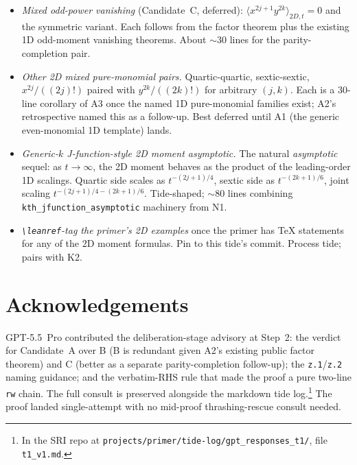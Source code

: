 \documentclass[11pt]{article}
\begin{document}
\begin{itemize}[leftmargin=1em,itemsep=0.2em]
\item \emph{Mixed odd-power vanishing} (Candidate~C, deferred):
  $\langle x^{2j+1} y^{2k} \rangle_{2D, t} = 0$ and the symmetric
  variant. Each follows from the factor theorem plus the existing
  1D odd-moment vanishing theorems. About ${\sim}30$ lines for the
  parity-completion pair.

\item \emph{Other 2D mixed pure-monomial pairs.} Quartic-quartic,
  sextic-sextic, $x^{2j}/((2j)!)$ paired with $y^{2k}/((2k)!)$ for
  arbitrary $(j, k)$. Each is a 30-line corollary of A3 once the
  named 1D pure-monomial families exist; A2's retrospective named
  this as a follow-up. Best deferred until A1 (the generic
  even-monomial 1D template) lands.

\item \emph{Generic-$k$ J-function-style 2D moment asymptotic.} The
  natural \emph{asymptotic} sequel: as $t \to \infty$, the 2D
  moment behaves as the product of the leading-order 1D scalings.
  Quartic side scales as $t^{-(2j+1)/4}$, sextic side as
  $t^{-(2k+1)/6}$, joint scaling $t^{-(2j+1)/4 - (2k+1)/6}$.
  Tide-shaped; ${\sim}80$ lines combining
  \texttt{kth\_jfunction\_asymptotic} machinery from N1.

\item \emph{\texttt{\textbackslash leanref}-tag the primer's 2D
  examples} once the primer has TeX statements for any of the 2D
  moment formulas. Pin to this tide's commit. Process tide; pairs
  with K2.
\end{itemize}

\section*{Acknowledgements}

GPT-5.5~Pro contributed the deliberation-stage advisory at Step~2:
the verdict for Candidate~A over B (B is redundant given A2's
existing public factor theorem) and C (better as a separate
parity-completion follow-up); the \texttt{z.1}/\texttt{z.2} naming
guidance; and the verbatim-RHS rule that made the proof a pure
two-line \texttt{rw} chain. The full consult is preserved alongside
the markdown tide log.\footnote{In the SRI repo at
\texttt{projects/primer/tide-log/gpt\_responses\_t1/}, file
\texttt{t1\_v1.md}.} The proof landed single-attempt with no
mid-proof thrashing-rescue consult needed.
\end{document}
